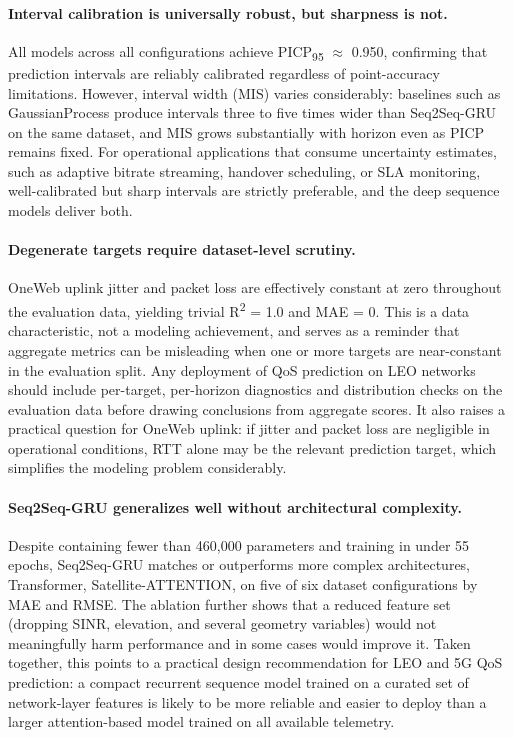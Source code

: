 \documentclass[12pt]{article}
\begin{document}
\paragraph{Interval calibration is universally robust, but sharpness is not.} All models across all configurations achieve PICP\textsubscript{95} $\approx$ 0.950, confirming that prediction intervals are reliably calibrated regardless of point-accuracy limitations. However, interval width (MIS) varies considerably: baselines such as GaussianProcess produce intervals three to five times wider than Seq2Seq-GRU on the same dataset, and MIS grows substantially with horizon even as PICP remains fixed. For operational applications that consume uncertainty estimates, such as adaptive bitrate streaming, handover scheduling, or SLA monitoring, well-calibrated but sharp intervals are strictly preferable, and the deep sequence models deliver both.

\paragraph{Degenerate targets require dataset-level scrutiny.} OneWeb uplink jitter and packet loss are effectively constant at zero throughout the evaluation data, yielding trivial R\textsuperscript{2} = 1.0 and MAE = 0. This is a data characteristic, not a modeling achievement, and serves as a reminder that aggregate metrics can be misleading when one or more targets are near-constant in the evaluation split. Any deployment of QoS prediction on LEO networks should include per-target, per-horizon diagnostics and distribution checks on the evaluation data before drawing conclusions from aggregate scores. It also raises a practical question for OneWeb uplink: if jitter and packet loss are negligible in operational conditions, RTT alone may be the relevant prediction target, which simplifies the modeling problem considerably.

\paragraph{Seq2Seq-GRU generalizes well without architectural complexity.} Despite containing fewer than 460{,}000 parameters and training in under 55 epochs, Seq2Seq-GRU matches or outperforms more complex architectures, Transformer, Satellite-ATTENTION, on five of six dataset configurations by MAE and RMSE. The ablation further shows that a reduced feature set (dropping SINR, elevation, and several geometry variables) would not meaningfully harm performance and in some cases would improve it. Taken together, this points to a practical design recommendation for LEO and 5G QoS prediction: a compact recurrent sequence model trained on a curated set of network-layer features is likely to be more reliable and easier to deploy than a larger attention-based model trained on all available telemetry.
\end{document}
